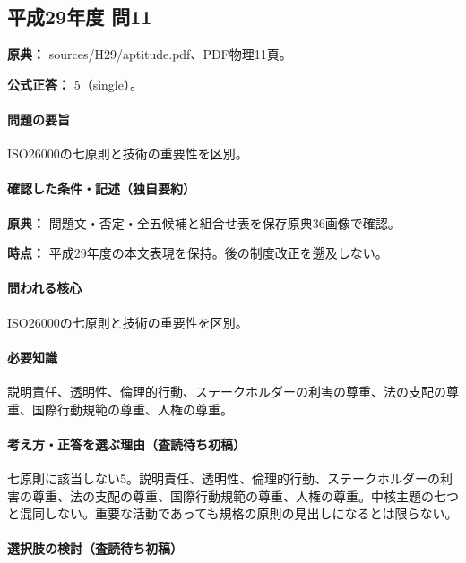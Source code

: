 \subsection{平成29年度 問11}
\label{q:h29-reg-apt-11}

\noindent\textbf{原典：} sources/H29/aptitude.pdf、PDF物理11頁。

\textbf{公式正答：} 5（single）。

\paragraph{問題の要旨} ISO26000の七原則と技術の重要性を区別。

\paragraph{確認した条件・記述（独自要約）}\mbox{}\par

\noindent\textbf{原典：} 問題文・否定・全五候補と組合せ表を保存原典36画像で確認。\par

\noindent\textbf{時点：} 平成29年度の本文表現を保持。後の制度改正を遡及しない。\par

\paragraph{問われる核心} ISO26000の七原則と技術の重要性を区別。

\paragraph{必要知識} 説明責任、透明性、倫理的行動、ステークホルダーの利害の尊重、法の支配の尊重、国際行動規範の尊重、人権の尊重。

\paragraph{考え方・正答を選ぶ理由（査読待ち初稿）} 七原則に該当しない5。説明責任、透明性、倫理的行動、ステークホルダーの利害の尊重、法の支配の尊重、国際行動規範の尊重、人権の尊重。中核主題の七つと混同しない。重要な活動であっても規格の原則の見出しになるとは限らない。

\paragraph{選択肢の検討（査読待ち初稿）}\mbox{}\par

